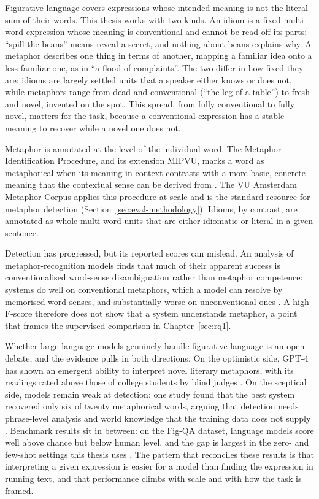 Figurative language covers expressions whose intended meaning is not the literal
sum of their words. This thesis works with two kinds. An idiom is a fixed
multi-word expression whose meaning is conventional and cannot be read off its
parts: ``spill the beans'' means reveal a secret, and nothing about beans
explains why. A metaphor describes one thing in terms of another, mapping a
familiar idea onto a less familiar one, as in ``a flood of complaints''. The two
differ in how fixed they are: idioms are largely settled units that a speaker
either knows or does not, while metaphors range from dead and conventional
(``the leg of a table'') to fresh and novel, invented on the spot. This spread,
from fully conventional to fully novel, matters for the task, because a
conventional expression has a stable meaning to recover while a novel one does
not.

Metaphor is annotated at the level of the individual word. The Metaphor
Identification Procedure, and its extension MIPVU, marks a word as metaphorical
when its meaning in context contrasts with a more basic, concrete meaning that
the contextual sense can be derived from \cite{mipvu}. The VU Amsterdam Metaphor
Corpus applies this procedure at scale and is the standard resource for metaphor
detection (Section~\ref{sec:eval-methodology}). Idioms, by contrast, are
annotated as whole multi-word units that are either idiomatic or literal in a
given sentence.

Detection has progressed, but its reported scores can mislead. An analysis of
metaphor-recognition models finds that much of their apparent success is
conventionalised word-sense disambiguation rather than metaphor competence:
systems do well on conventional metaphors, which a model can resolve by
memorised word senses, and substantially worse on unconventional ones
\cite{Neidlein2020}. A high F-score therefore does not show that a system
understands metaphor, a point that frames the supervised comparison in
Chapter~\ref{sec:rq1}.

Whether large language models genuinely handle figurative language is an open
debate, and the evidence pulls in both directions. On the optimistic side,
GPT-4 has shown an emergent ability to interpret novel literary metaphors, with
its readings rated above those of college students by blind judges
\cite{Ichien2024}. On the sceptical side, models remain weak at detection: one
study found that the best system recovered only six of twenty metaphorical words,
arguing that detection needs phrase-level analysis and world knowledge that the
training data does not supply \cite{Dmitrijev2024}. Benchmark results sit in
between: on the Fig-QA dataset, language models score well above chance but
below human level, and the gap is largest in the zero- and few-shot settings
this thesis uses \cite{Liu2022}. The pattern that reconciles these results is
that interpreting a given expression is easier for a model than finding the
expression in running text, and that performance climbs with scale and with how
the task is framed.

